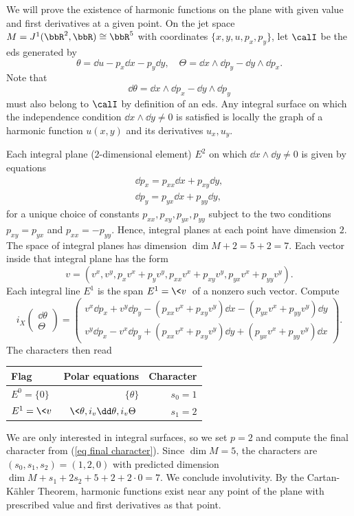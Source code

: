 \begin{example}
    We will prove the existence of harmonic functions on the plane with given value and first derivatives at a given point. On the jet space $M=J^1(\bbR^2,\bbR)\cong\bbR^5$ with coordinates $\{x,y,u,p_x,p_y\}$, let $\calI$ be the \gls{eds} generated by 
    \[\theta=\dd u-p_x \dd x-p_y\dd y,\quad \Theta=\dd x\wedge \dd p_y-\dd y\wedge\dd p_x.\]
    Note that 
    \[\dd\theta=\dd x\wedge \dd p_x-\dd y\wedge \dd p_y\]
    must also belong to $\calI$ by definition of an \gls{eds}. Any integral surface on which the independence condition $\dd x\wedge\dd y\neq 0$ is satisfied is locally the graph of a harmonic function $u(x,y)$ and its derivatives $u_x,u_y$.

    Each integral plane ($2$-dimensional element) $E^2$ on which $\dd x\wedge\dd y\neq 0$ is given by equations 
    \begin{align}
        \dd p_x=p_{xx}\dd x+p_{xy}\dd y,\\
        \dd p_y=p_{yx}\dd x+p_{yy}\dd y,
    \end{align}
    for a unique choice of constants $p_{xx},p_{xy},p_{yx},p_{yy}$ subject to the two conditions $p_{xy}=p_{yx}$ and $p_{xx}=-p_{yy}$. Hence, integral planes at each point have dimension $2$. The space of integral planes has dimension $\dim M+2=5+2=7$. Each vector inside that integral plane has the form 
    \[v=\left(v^x,v^y,p_xv^x+p_yv^y,p_{xx}v^x+p_{xy}v^y,p_{yx}v^x+p_{yy}v^y\right).\]
    Each integral line $E^1$ is the span $E^1=\<v\>$ of a nonzero such vector. Compute 
    \[i_X \begin{pmatrix}
        \dd \theta \\
        \Theta
    \end{pmatrix}=
    \begin{pmatrix}
        v^x \dd p_x+v^y\dd p_y-(p_{xx}v^x+p_{xy}v^y)\dd x-(p_{yx}v^x+p_{yy}v^y)\dd y\\
        v^y\dd p_x-v^x\dd p_y+(p_{xx}v^x+p_{xy}v^y)\dd y+(p_{yx}v^x+p_{yy}v^y)\dd x
    \end{pmatrix}.
    \]
    The characters then read 
    \begin{center}
        \begin{tabular}{l r r} 
         Flag & Polar equations & Character \\ [0.5ex] 
         \hline
         $E^0=\{0\}$ & $\{\theta\}$ & $s_0=1$ \\ 
         $E^1=\<v\>$ & $\<\theta,i_v\dd\theta,i_v\Theta\>$ & $s_1=2$ \\
         \hline
        \end{tabular}
    \end{center}
    We are only interested in integral surfaces, so we set $p=2$ and compute the final character from (\ref{eq final character}). Since $\dim M=5$, the characters are $(s_0,s_1,s_2)=(1,2,0)$ with predicted dimension $\dim M+s_1+2s_2+5+2+2\cdot 0=7$. We conclude involutivity. By the Cartan-K\"ahler Theorem, harmonic functions exist near any point of the plane with prescribed value and first derivatives as that point.
\end{example}



